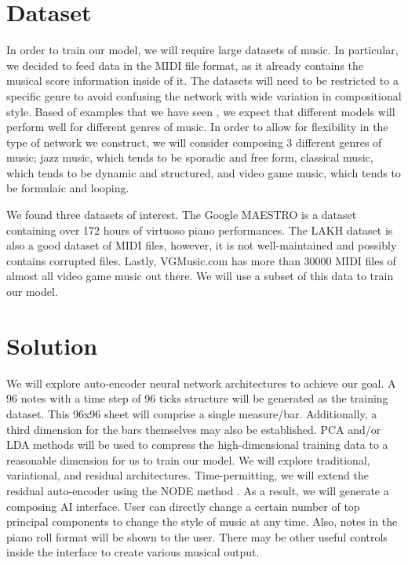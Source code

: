 \documentclass[conference]{IEEEtran}
\begin{document}
\section{Dataset}
In order to train our model, we will require large datasets of music. In particular, we decided to feed data in the MIDI file format, as it already contains the musical score information inside of it. The datasets will need to be restricted to a specific genre to avoid confusing the network with wide variation in compositional style. Based of examples that we have seen \cite{ComposerVideo}\cite{JazzVideo}\cite{BaroqueVideo}, we expect that different models will perform well for different genres of music. In order to allow for flexibility in the type of network we construct, we will consider composing 3 different genres of music; jazz music, which tends to be sporadic and free form, classical music, which tends to be dynamic and structured, and video game music, which tends to be formulaic and looping.\par 
We found three datasets of interest. The Google MAESTRO \cite{maestro2018} is a dataset containing over 172 hours of virtuoso piano performances. The LAKH dataset \cite{lakh2011} is also a good dataset of MIDI files, however, it is not well-maintained and possibly contains corrupted files. Lastly, VGMusic.com \cite{vgmusic} has more than 30000 MIDI files of almost all video game music out there. We will use a subset of this data to train our model.


\section{Solution}
We will explore auto-encoder neural network architectures to achieve our goal.
A 96 notes with a time step of 96 ticks structure will be generated as the training dataset. This 96x96 sheet will comprise a single measure/bar. Additionally, a third dimension for the bars themselves may also be established. PCA and/or LDA methods will be used to compress the high-dimensional training data to a reasonable dimension for us to train our model. We will explore traditional, variational, and residual architectures. Time-permitting, we will extend the residual auto-encoder using the NODE method \cite{NODE}. As a result, we will generate a composing AI interface. User can directly change a certain number of top principal components to change the style of music at any time. Also, notes in the piano roll format will be shown to the user. There may be other useful controls inside the interface to create various musical output.
\end{document}
